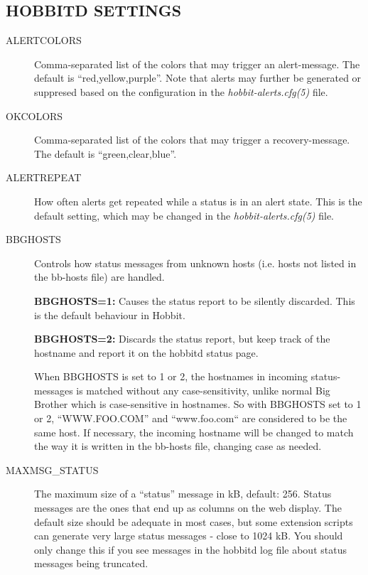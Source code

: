 \subsection{HOBBITD SETTINGS}


 \begin{description}
\item[ALERTCOLORS] Comma-separated list of the colors that may trigger an alert-message. The default is ``red,yellow,purple''. Note that alerts may further be generated or suppresed based on the configuration in the \emph{hobbit-alerts.cfg(5)}
 file. 

 

\item[OKCOLORS] Comma-separated list of the colors that may trigger a recovery-message. The default is ``green,clear,blue''. 

 

\item[ALERTREPEAT] How often alerts get repeated while a status is in an alert state. This is the default setting, which may be changed in the \emph{hobbit-alerts.cfg(5)}
 file. 

 

\item[BBGHOSTS] Controls how status messages from unknown hosts (i.e. hosts not listed in the bb-hosts file) are handled. 

 \textbf{BBGHOSTS=1:}
 Causes the status report to be silently discarded. This is the default behaviour in Hobbit. 


 \textbf{BBGHOSTS=2:}
 Discards the status report, but keep track of the hostname and report it on the hobbitd status page. 


  When BBGHOSTS is set to 1 or 2, the hostnames in incoming status-messages is matched without any case-sensitivity, unlike normal Big Brother which is case-sensitive in hostnames. So with BBGHOSTS set to 1 or 2, ``WWW.FOO.COM'' and ``www.foo.com`` are considered to be the same host. If necessary, the incoming hostname will be changed to match the way it is written in the bb-hosts file, changing case as needed. 


 

\item[MAXMSG\_STATUS] The maximum size of a ``status'' message in kB, default: 256. Status messages are the ones that end up as columns on the web display. The default size should be adequate in most cases, but some extension scripts can generate very large status messages - close to 1024 kB. You should only change this if you see messages in the hobbitd log file about status messages being truncated. 


\end{description}
